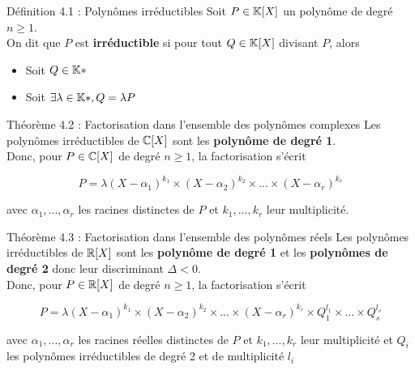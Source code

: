 \begin{theorem}[red]{Définition 4.1 : Polynômes irréductibles}
    Soit $P \in \mathbb{K}[X]$ un polynôme de degré $n \geq 1$. \\
    On dit que $P$ est \textbf{irréductible} si pour tout $Q \in \mathbb{K}[X]$ divisant $P$, alors

    \begin{itemize}
        \item Soit $Q \in \mathbb{K}*$
        \item Soit $\exists \lambda \in \mathbb{K}*, Q = \lambda P$
    \end{itemize}
\end{theorem}

\begin{theorem}[orange]{Théorème 4.2 : Factorisation dans l'ensemble des polynômes complexes}
    Les polynômes irréductibles de $\mathbb{C}[X]$ sont les \textbf{polynôme de degré 1}. \\
    Donc, pour $P \in \mathbb{C}[X]$ de degré $n \geq 1$, la factorisation s'écrit

    $$
        P = \lambda(X - \alpha_1)^{k_1} \times (X - \alpha_2)^{k_2} \times ... \times (X - \alpha_r)^{k_r}
    $$

    \noindent avec $\alpha_1, ..., \alpha_r$ les racines distinctes de $P$ et $k_1, ..., k_r$ leur multiplicité.
\end{theorem}

\begin{theorem}[orange]{Théorème 4.3 : Factorisation dans l'ensemble des polynômes réels}
    Les polynômes irréductibles de $\mathbb{R}[X]$ sont les \textbf{polynôme de degré 1} et les \textbf{polynômes de degré 2} donc leur discriminant $\Delta < 0$. \\
    Donc, pour $P \in \mathbb{R}[X]$ de degré $n \geq 1$, la factorisation s'écrit

    $$
        P = \lambda(X - \alpha_1)^{k_1} \times (X - \alpha_2)^{k_2} \times ... \times (X - \alpha_r)^{k_r} \times Q_1^{l_1} \times ... \times Q_s^{l_s}
    $$

    \noindent avec $\alpha_1, ..., \alpha_r$ les racines réelles distinctes de $P$ et $k_1, ..., k_r$ leur multiplicité et $Q_i$ les polynômes irréductibles de degré 2 et de multiplicité $l_i$
\end{theorem}